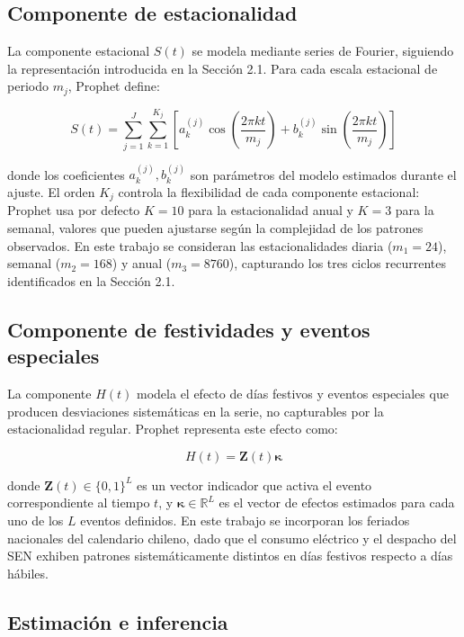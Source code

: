 \subsection{Componente de estacionalidad}

La componente estacional $S(t)$ se modela mediante series de Fourier, siguiendo la representación introducida en la Sección 2.1. Para cada escala estacional de periodo $m_j$, Prophet define:

\begin{equation}
S(t) = \sum_{j=1}^{J}\sum_{k=1}^{K_j} \left[ a_k^{(j)} \cos\left(\frac{2\pi k t}{m_j}\right) + b_k^{(j)} \sin\left(\frac{2\pi k t}{m_j}\right) \right]
\end{equation}

donde los coeficientes $a_k^{(j)}, b_k^{(j)}$ son parámetros del modelo estimados durante el ajuste. El orden $K_j$ controla la flexibilidad de cada componente estacional: Prophet usa por defecto $K=10$ para la estacionalidad anual y $K=3$ para la semanal, valores que pueden ajustarse según la complejidad de los patrones observados. En este trabajo se consideran las estacionalidades diaria ($m_1 = 24$), semanal ($m_2 = 168$) y anual ($m_3 = 8760$), capturando los tres ciclos recurrentes identificados en la Sección 2.1.

\subsection{Componente de festividades y eventos especiales}

La componente $H(t)$ modela el efecto de días festivos y eventos especiales que producen desviaciones sistemáticas en la serie, no capturables por la estacionalidad regular. Prophet representa este efecto como:

\begin{equation}
H(t) = \mathbf{Z}(t)\boldsymbol{\kappa}
\end{equation}

donde $\mathbf{Z}(t) \in \{0,1\}^{L}$ es un vector indicador que activa el evento correspondiente al tiempo $t$, y $\boldsymbol{\kappa} \in \mathbb{R}^{L}$ es el vector de efectos estimados para cada uno de los $L$ eventos definidos. En este trabajo se incorporan los feriados nacionales del calendario chileno, dado que el consumo eléctrico y el despacho del SEN exhiben patrones sistemáticamente distintos en días festivos respecto a días hábiles.

\subsection{Estimación e inferencia}

